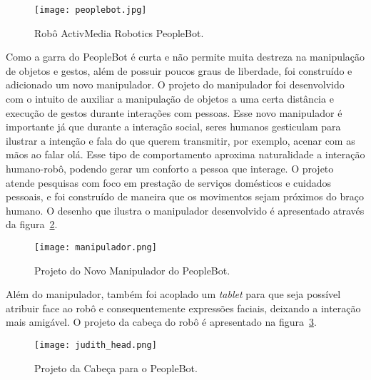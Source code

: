 \begin{figure}[ht!]
	\centering
	\begin{minipage}{\textwidth}
		\caption{Robô ActivMedia Robotics PeopleBot.}
		\texttt{[image: peoplebot.jpg]}
		\label{fig:peoplebot}
	\end{minipage}
\end{figure}

Como a garra do PeopleBot é curta e não permite muita destreza na manipulação de objetos e gestos, além de possuir poucos graus de liberdade, foi construído e adicionado um novo manipulador. O projeto do manipulador foi desenvolvido com o intuito de auxiliar a manipulação de objetos a uma certa distância e execução de gestos durante interações com pessoas. Esse novo manipulador é importante já que durante a interação social, seres humanos gesticulam para ilustrar a intenção e fala do que querem transmitir, por exemplo, acenar com as mãos ao falar olá. Esse tipo de comportamento aproxima naturalidade a interação humano-robô, podendo gerar um conforto a pessoa que interage. O projeto atende pesquisas com foco em prestação de serviços domésticos e cuidados pessoais, e foi construído de maneira que os movimentos sejam próximos do braço humano. O desenho que ilustra o manipulador desenvolvido é apresentado através da figura~\ref{fig:manipulador}. 

\begin{figure}[ht!]
	\centering
	\begin{minipage}{0.6\textwidth}
		\caption{Projeto do Novo Manipulador do PeopleBot.}
		\texttt{[image: manipulador.png]}
		\label{fig:manipulador}
	\end{minipage}
\end{figure}

Além do manipulador, também foi acoplado um \emph{tablet} para que seja possível atribuir face ao robô e consequentemente expressões faciais, deixando a interação mais amigável. O projeto da cabeça do robô é apresentado na figura~\ref{fig:judithhead}.

\begin{figure}[ht!]
	\centering
	\begin{minipage}{0.4\textwidth}
		\caption{Projeto da Cabeça para o PeopleBot.}
		\texttt{[image: judith\_head.png]}
		\label{fig:judithhead}
	\end{minipage}
\end{figure}


